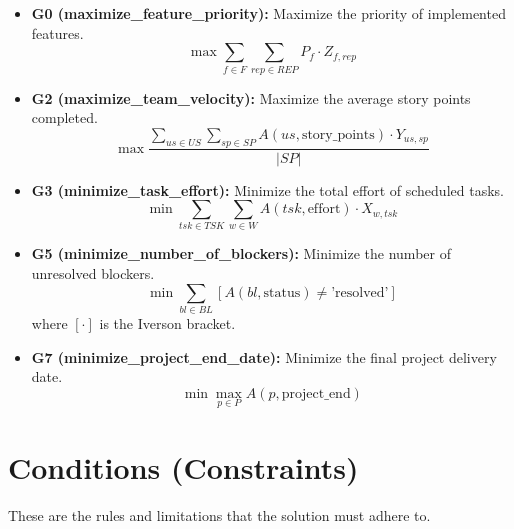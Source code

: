 \documentclass{article}
\begin{document}
\begin{itemize}
    \item \textbf{G0 (maximize\_feature\_priority):} Maximize the priority of implemented features.
    $$ \max \sum_{f \in F} \sum_{rep \in REP} P_f \cdot Z_{f,rep} $$
    \item \textbf{G2 (maximize\_team\_velocity):} Maximize the average story points completed.
    $$ \max \frac{\sum_{us \in US} \sum_{sp \in SP} A(us, \text{story\_points}) \cdot Y_{us,sp}}{|SP|} $$
    \item \textbf{G3 (minimize\_task\_effort):} Minimize the total effort of scheduled tasks.
    $$ \min \sum_{tsk \in TSK} \sum_{w \in W} A(tsk, \text{effort}) \cdot X_{w,tsk} $$
    \item \textbf{G5 (minimize\_number\_of\_blockers):} Minimize the number of unresolved blockers.
    $$ \min \sum_{bl \in BL} [A(bl, \text{status}) \neq \text{'resolved'}] $$
    where $[\cdot]$ is the Iverson bracket.
    \item \textbf{G7 (minimize\_project\_end\_date):} Minimize the final project delivery date.
    $$ \min \max_{p \in P} A(p, \text{project\_end}) $$
\end{itemize}

\section{Conditions (Constraints)}
These are the rules and limitations that the solution must adhere to.
\end{document}
